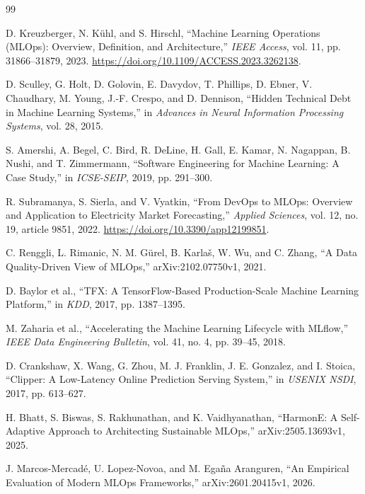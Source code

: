 \documentclass[runningheads]{llncs}
\begin{document}
\begin{thebibliography}{99}

D. Kreuzberger, N. K\"uhl, and S. Hirschl, ``Machine Learning Operations (MLOps): Overview, Definition, and Architecture,'' \textit{IEEE Access}, vol. 11, pp. 31866--31879, 2023. \url{https://doi.org/10.1109/ACCESS.2023.3262138}.

D. Sculley, G. Holt, D. Golovin, E. Davydov, T. Phillips, D. Ebner,
V. Chaudhary, M. Young, J.-F. Crespo, and D. Dennison,
``Hidden Technical Debt in Machine Learning Systems,''
in \textit{Advances in Neural Information Processing Systems}, vol. 28, 2015.

S. Amershi, A. Begel, C. Bird, R. DeLine, H. Gall, E. Kamar,
N. Nagappan, B. Nushi, and T. Zimmermann,
``Software Engineering for Machine Learning: A Case Study,''
in \textit{ICSE-SEIP}, 2019, pp. 291--300.

R. Subramanya, S. Sierla, and V. Vyatkin, ``From DevOps to MLOps: Overview and Application to Electricity Market Forecasting,'' \textit{Applied Sciences}, vol. 12, no. 19, article 9851, 2022. \url{https://doi.org/10.3390/app12199851}.

C. Renggli, L. Rimanic, N. M. G\"urel, B. Karla\v{s}, W. Wu, and C. Zhang, ``A Data Quality-Driven View of MLOps,'' arXiv:2102.07750v1, 2021.

D. Baylor et al.,
``TFX: A TensorFlow-Based Production-Scale Machine Learning Platform,''
in \textit{KDD}, 2017, pp. 1387--1395.

M. Zaharia et al., ``Accelerating the Machine Learning Lifecycle with MLflow,'' \textit{IEEE Data Engineering Bulletin}, vol. 41, no. 4, pp. 39--45, 2018.

D. Crankshaw, X. Wang, G. Zhou, M. J. Franklin, J. E. Gonzalez, and I. Stoica,
``Clipper: A Low-Latency Online Prediction Serving System,''
in \textit{USENIX NSDI}, 2017, pp. 613--627.

H. Bhatt, S. Biswas, S. Rakhunathan, and K. Vaidhyanathan, ``HarmonE: A Self-Adaptive Approach to Architecting Sustainable MLOps,'' arXiv:2505.13693v1, 2025.

J. Marcos-Mercad\'e, U. Lopez-Novoa, and M. Ega\~na Aranguren, ``An Empirical Evaluation of Modern MLOps Frameworks,'' arXiv:2601.20415v1, 2026.


\end{thebibliography}
\end{document}
